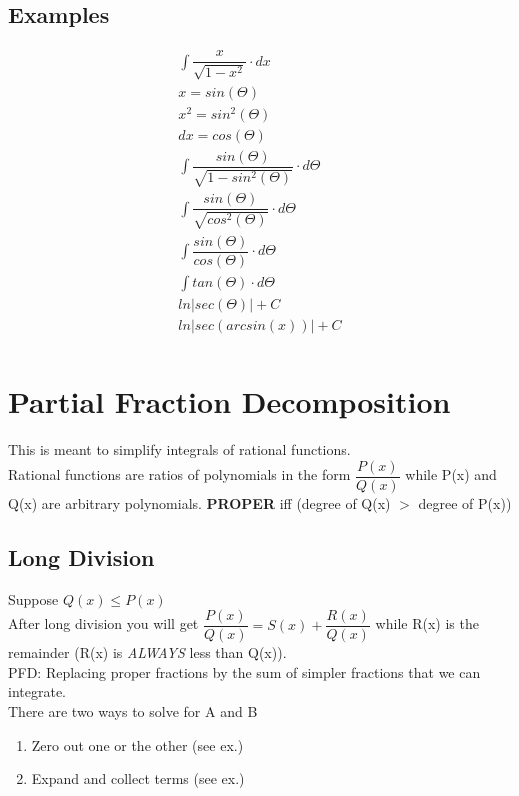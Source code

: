 \documentclass{article}
\begin{document}
\subsection*{Examples}
\begin{equation}
\begin{aligned}
\int \dfrac{x}{\sqrt{1-x^2}} \cdot dx\\
x = sin(\Theta)\\
x^2 = sin^2(\Theta)\\
dx = cos(\Theta)\\
\int \dfrac{sin(\Theta)}{\sqrt{1-sin^2(\Theta)}} \cdot d\Theta\\
\int \dfrac{sin(\Theta)}{\sqrt{cos^2(\Theta)}} \cdot d\Theta\\
\int \dfrac{sin(\Theta)}{cos(\Theta)} \cdot d\Theta\\
\int tan(\Theta) \cdot d\Theta\\
ln|sec(\Theta)|+C\\
ln|sec(arcsin(x))|+C\\
\end{aligned}
\end{equation}
\section{Partial Fraction Decomposition}
This is meant to simplify integrals of rational functions.\\
\indent Rational functions are ratios of polynomials in the form $ \dfrac{P(x)}{Q(x)} $ while P(x) and Q(x) are arbitrary polynomials.
\textbf{PROPER} iff (degree of Q(x) $>$ degree of P(x))
\subsection*{Long Division}
Suppose $ Q(x) \le P(x) $\\
After long division you will get $ \dfrac{P(x)}{Q(x)}=S(x)+\dfrac{R(x)}{Q(x)} $ while R(x) is the remainder (R(x) is \textit{ALWAYS} less than Q(x)).\\
PFD: Replacing proper fractions by the sum of simpler fractions that we can integrate.\\
There are two ways to solve for A and B
\begin{enumerate}
\item Zero out one or the other (see ex.)
\item Expand and collect terms (see ex.)
\end{enumerate}
\end{document}

